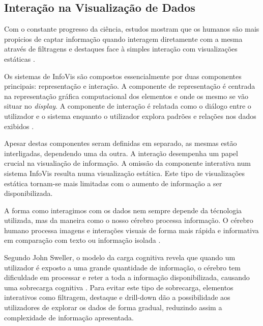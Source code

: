 \subsection{Interação na Visualização de Dados} %
\label{sub:elem_int}

Com o constante progresso da ciência, estudos mostram que os humanos são mais propicios de captar informação quando interagem diretamente com a mesma através de filtragens e destaques face à simples interação com visualizações estáticas \cite{heer2012interactive}. 

Os sistemas de \gls{InfoVis} são compostos essencialmente por duas componentes principais: representação e interação. A componente de representação é centrada na representação gráfica computacional dos elementos e onde os mesmo se vão situar no \textit{display}. A componente de interação é relatada como o diálogo entre o utilizador e o sistema enquanto o utilizador explora padrões e relações nos dados exibidos \cite{yi2007toward}. 

Apesar destas componentes seram definidas em separado, as mesmas estão interligadas, dependendo uma da outra. A interação desempenha um papel crucial na visualiação de informação. A omissão da componente interativa num sistema \gls{InfoVis} resulta numa visualização estática. Este tipo de visualizações estática tornam-se mais limitadas com o aumento de informação a ser disponibilizada.

A forma como interagimos com os dados nem sempre depende da técnologia utilizada, mas da maneira como o nosso cérebro processa informação. O cérebro humano processa imagens e interações visuais de forma mais rápida e informativa em comparação com texto ou informação isolada \cite{ware2019information}.

Segundo John Sweller, o modelo da carga cognitiva revela que quando um utilizador é exposto a uma grande quantidade de informação, o cérebro tem dificuldade em processar e reter a toda a informação disponibilizada, causando uma sobrecarga cognitiva \cite{sweller1988cognitive}. Para evitar este tipo de sobrecarga, elementos interativos como filtragem, destaque e drill-down dão a possibilidade aos utilizadores de explorar os dados de forma gradual, reduzindo assim a complexidade de informação apresentada.


